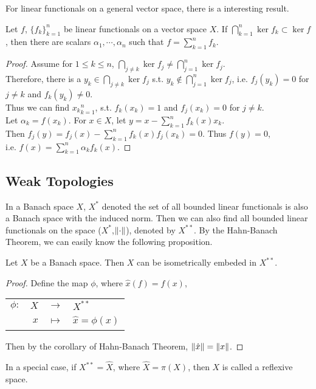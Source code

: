 \documentclass[a4paper,11pt]{report}
\begin{document}
For linear functionals on a general vector space, there is a interesting result.
\begin{prop} \label{prop2}
	Let $f$, $\{f_k\}_{k=1}^{n}$ be linear functionals on a vector space $X$. If $\bigcap_{k=1}^{n}\ker{f_k} \subset \ker{f}$, then there are scalars $\alpha_1,\cdots,\alpha_n$ such that $f = \sum_{k=1}^{n} f_k$.
\end{prop}
\begin{proof}
	Assume for $1 \leqslant k \leqslant n$, $\bigcap_{j \neq k} \ker{f_j} \neq \bigcap_{j=1}^{n} \ker{f_j}$.\\ Therefore, there is a $y_k \in \bigcap_{j \neq k} \ker{f_j}$ s.t. $y_k \notin \bigcap_{j=1}^{n} \ker{f_j}$, i.e. $f_j(y_k) = 0$ for $j \neq k$ and $f_k(y_k) \neq 0$. \\Thus we can find ${x_k}_{k=1}^{n}$, s.t. $f_k(x_k) = 1$ and $f_j(x_k)=0$ for $j \neq k$. \\Let $\alpha_k = f(x_k)$. For $x \in X$, let $y=x-\sum_{k=1}^{n} f_k(x)x_k$. \\Then $f_j(y)=f_j(x) - \sum_{k=1}^{n} f_k(x)f_j(x_k)=0$. Thus $f(y) = 0$, \\i.e. $f(x) = \sum_{k=1}^{n} \alpha_k f_k(x)$.
\end{proof}

\subsection{Weak Topologies}

In a Banach space $X$, $X^{*}$ denoted the set of all bounded linear functionals is also a Banach space with the induced norm. Then we can also find all bounded linear functionals on the space ($X^{*}$,$\left\lVert\cdot\right\lVert$), denoted by $X^{**}$. By the Hahn-Banach Theorem, we can easily know the following proposition.

\begin{prop}
	Let $X$ be a Banach space. Then $X$ can be isometrically embeded in $X^{**}$.
\end{prop}
\begin{proof}
	Define the map $\phi$, where $\hat{x}(f) = f(x)$,
	\begin{center}
		\begin{tabular}{l r c l}
			$\phi \colon$ & $X$ & $\longrightarrow$ & $X^{**}$ \\
			~ & $x$ & $\longmapsto$ & $\hat{x} = \phi(x)$
		\end{tabular}
	\end{center}
	Then by the corollary of Hahn-Banach Theorem, $\left\lVert\hat{x}\right\lVert=\left\lVert x\right\lVert$.
\end{proof}
\begin{rem}
	In a special case, if $X^{**} = \hat{X}$, where $\hat{X} = \pi(X)$, then $X$ is called a reflexive space.
\end{rem}
\end{document}
